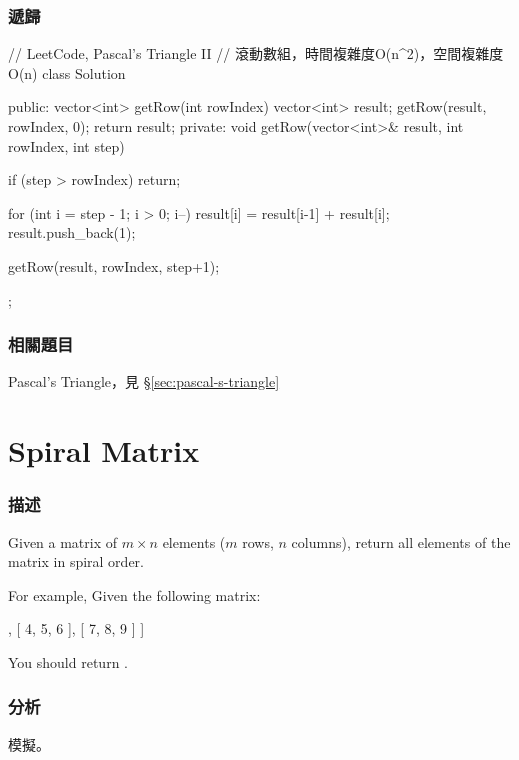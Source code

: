 \subsubsection{遞歸}
\begin{Code}
// LeetCode, Pascal's Triangle II
// 滾動數組，時間複雜度O(n^2)，空間複雜度O(n)
class Solution {
public:
    vector<int> getRow(int rowIndex) {
        vector<int> result;
        getRow(result, rowIndex, 0);
        return result;
    }
private:
    void getRow(vector<int>& result, int rowIndex, int step) {
        if (step > rowIndex) return;

        for (int i = step - 1; i > 0; i--)
            result[i] = result[i-1] + result[i];
        result.push_back(1);

        getRow(result, rowIndex, step+1);
    }
};
\end{Code}

\subsubsection{相關題目}
\begindot
\item Pascal's Triangle，見 \S \ref{sec:pascal-s-triangle}
\myenddot


\section{Spiral Matrix} %
\label{sec:spiral-matrix}


\subsubsection{描述}
Given a matrix of $m \times n$ elements ($m$ rows, $n$ columns), return all elements of the matrix in spiral order.

For example,
Given the following matrix:
\begin{Code}
[
 [ 1, 2, 3 ],
 [ 4, 5, 6 ],
 [ 7, 8, 9 ]
]
\end{Code}
You should return \fn{[1,2,3,6,9,8,7,4,5]}.


\subsubsection{分析}
模擬。

